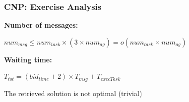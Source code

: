 \begin{frame}
	\frametitle{CNP: Exercise Analysis}
	
	\Large
	
	\textbf{Number of messages:} \\
	
	\begin{center}
		\vspace{-0.1cm}
		
		$ num_{msg} \leq num_{task} \times (3 \times num_{ag}) = o(num_{task} \times
		  num_{ag}) $
	\end{center}
	
	\vspace{0.3cm}
	
	\textbf{Waiting time:} \\	
	
	\begin{center}
		\vspace{-0.1cm}
		
		$ T_{tot} = (bid_{time} + 2) \times T_{msg} + T_{execTask} $
	\end{center}
	
	\vspace{0.4cm}
	
	The retrieved solution is not optimal (trivial)
\end{frame}
